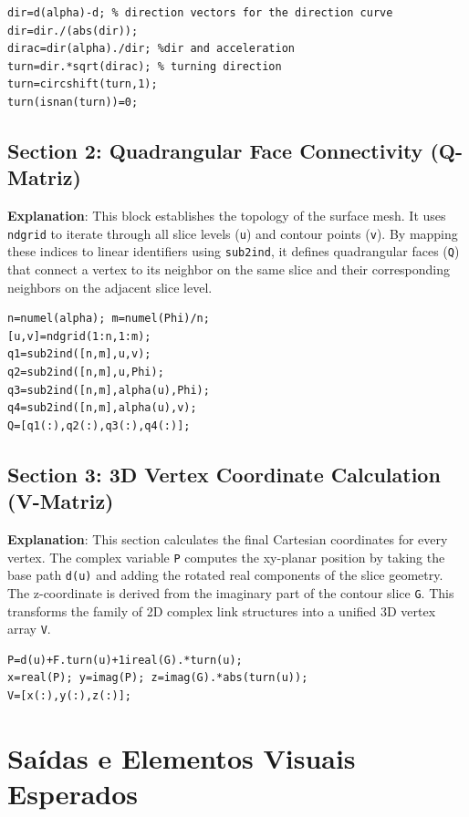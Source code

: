 \begin{lstlisting}
dir=d(alpha)-d; % direction vectors for the direction curve
dir=dir./(abs(dir));
dirac=dir(alpha)./dir; %dir and acceleration
turn=dir.*sqrt(dirac); % turning direction
turn=circshift(turn,1);
turn(isnan(turn))=0;
\end{lstlisting}

\subsection{Section 2: Quadrangular Face Connectivity (Q-Matriz)}
\textbf{Explanation}: This block establishes the topology of the surface mesh. It uses \texttt{ndgrid} to iterate through all slice levels (\texttt{u}) and contour points (\texttt{v}). By mapping these indices to linear identifiers using \texttt{sub2ind}, it defines quadrangular faces (\texttt{Q}) that connect a vertex to its neighbor on the same slice and their corresponding neighbors on the adjacent slice level.

\begin{lstlisting}
n=numel(alpha); m=numel(Phi)/n;
[u,v]=ndgrid(1:n,1:m);
q1=sub2ind([n,m],u,v);
q2=sub2ind([n,m],u,Phi);
q3=sub2ind([n,m],alpha(u),Phi);
q4=sub2ind([n,m],alpha(u),v);
Q=[q1(:),q2(:),q3(:),q4(:)];
\end{lstlisting}

\subsection{Section 3: 3D Vertex Coordinate Calculation (V-Matriz)}
\textbf{Explanation}: This section calculates the final Cartesian coordinates for every vertex. The complex variable \texttt{P} computes the xy-planar position by taking the base path \texttt{d(u)} and adding the rotated real components of the slice geometry. The z-coordinate is derived from the imaginary part of the contour slice \texttt{G}. This transforms the family of 2D complex link structures into a unified 3D vertex array \texttt{V}.

\begin{lstlisting}
P=d(u)+F.turn(u)+1ireal(G).*turn(u);
x=real(P); y=imag(P); z=imag(G).*abs(turn(u));
V=[x(:),y(:),z(:)];
\end{lstlisting}

\section{Saídas e Elementos Visuais Esperados}

